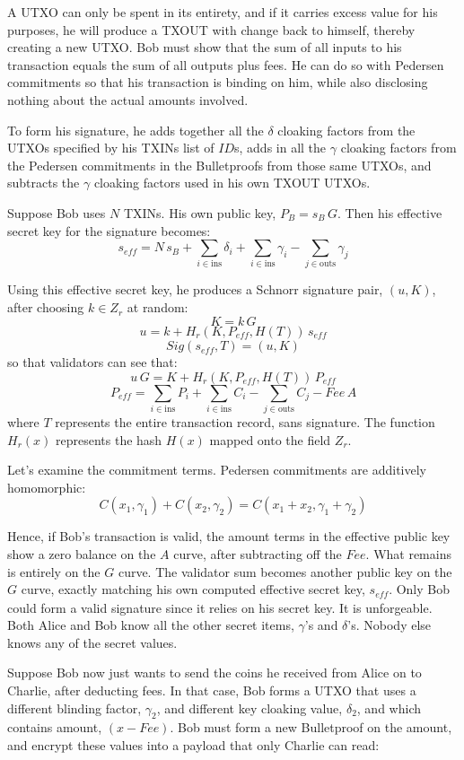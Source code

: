 \documentclass[8pt,fleqn,openany]{book}
\begin{document}
{A UTXO can only be spent in its entirety, and if it carries excess value for his purposes, he will produce a TXOUT with change back to himself, thereby creating a new UTXO. Bob must show that the sum of all inputs to his transaction equals the sum of all outputs plus fees. He can do so with Pedersen commitments so that his transaction is binding on him, while also disclosing nothing about the actual amounts involved.

To form his signature, he adds together all the $\delta$ cloaking factors from the UTXOs specified by his TXINs list of $\mathit{ID}$s, adds in all the $\gamma$ cloaking factors from the Pedersen commitments in the Bulletproofs from those same UTXOs, and subtracts the $\gamma$ cloaking factors used in his own TXOUT UTXOs. 

Suppose Bob uses $N$ TXINs. His own public key, $P_B = s_B \, G$. Then his effective secret key for the signature becomes:
$$s_{\mathit{eff}} = N \, s_B + \sum_{i \in \text{ins}} {\delta_i} + \sum_{i \in \text{ins}}{\gamma_i} - \sum_{j \in \text{outs}}{ \gamma_j}$$

Using this effective secret key, he produces a Schnorr signature pair, $(u, K)$, after choosing $k \in Z_r$ at random:
$$K = k \, G$$
$$u = k + H_r(K, P_{eff}, H(T)) \, s_{\mathit{eff}}$$
$$Sig(s_{eff},T) = (u, K)$$
so that validators can see that:
$$u \, G = K + H_r(K, P_{eff}, H(T)) \, P_{eff}$$
$$P_{\mathit{eff}} = \sum_{i \in \text{ins}}{P_i} + \sum_{i \in \text{ins}}{C_i} - \sum_{j \in \text{outs}}{C_j} - \mathit{Fee} \, A$$
where $T$ represents the entire transaction record, sans signature. The function $H_r(x)$ represents the hash $H(x)$ mapped onto the field $Z_r$.

Let’s examine the commitment terms. Pedersen commitments are additively homomorphic:
$$C(x_1, \gamma_1) + C(x_2, \gamma_2) = C(x_1 + x_2, \gamma_1 + \gamma_2)$$

Hence, if Bob’s transaction is valid, the amount terms in the effective public key show a zero balance on the $A$ curve, after subtracting off the $\mathit{Fee}$. What remains is entirely on the $G$ curve. The validator sum becomes another public key on the $G$ curve, exactly matching his own computed effective secret key, $s_{\mathit{eff}}$. Only Bob could form a valid signature since it relies on his secret key. It is unforgeable. Both Alice and Bob know all the other secret items, $\gamma$’s and $\delta$’s. Nobody else knows any of the secret values.

Suppose Bob now just wants to send the coins he received from Alice on to Charlie, after deducting fees. In that case, Bob forms a UTXO that uses a different blinding factor, $\gamma_2$, and different key cloaking value, $\delta_2$, and which contains amount, $(x - \mathit{Fee})$. Bob must form a new Bulletproof on the amount, and encrypt these values into a payload that only Charlie can read:

}
\end{document}
